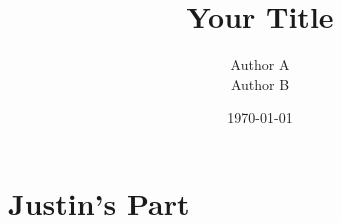 \documentclass[12pt]{article} %
\title{Your Title}
\author{
Author A\\
Author B
}
\date{\today} %
\begin{document}
\maketitle %
\begin{abstract}
\lipsum[1]
\end{abstract} %
\section{Justin's Part}

\end{document}
